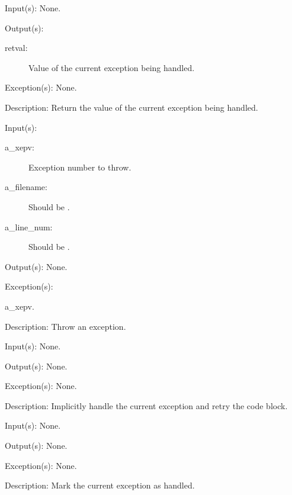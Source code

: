 \begin{capi}
	\begin{capilist}
	\item[Input(s): ] None.
	\item[Output(s): ]
		\begin{description}\item[]
		\item[retval: ]
			Value of the current exception being handled.
		\end{description}
	\item[Exception(s): ] None.
	\item[Description: ]
		Return the value of the current exception being handled.
	\end{capilist}
\label{xep_throw_e}
\label{xep_throw}
	\begin{capilist}
	\item[Input(s): ]
		\begin{description}\item[]
		\item[a\_xepv: ]
			Exception number to throw.
		\item[a\_filename: ]
			Should be .
		\item[a\_line\_num: ]
			Should be .
		\end{description}
	\item[Output(s): ] None.
	\item[Exception(s): ]
		\begin{description}\item[]
		\item[a\_xepv.]
		\end{description}
	\item[Description: ]
		Throw an exception.
	\end{capilist}
\label{xep_retry}
	\begin{capilist}
	\item[Input(s): ] None.
	\item[Output(s): ] None.
	\item[Exception(s): ] None.
	\item[Description: ]
		Implicitly handle the current exception and retry the
		 code block.
	\end{capilist}
\label{xep_handled}
	\begin{capilist}
	\item[Input(s): ] None.
	\item[Output(s): ] None.
	\item[Exception(s): ] None.
	\item[Description: ]
		Mark the current exception as handled.
	\end{capilist}
\end{capi}
